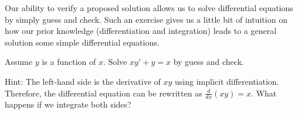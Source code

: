 \documentclass[../main.tex]{subfiles}
\begin{document}
Our ability to verify a proposed solution allows us to solve differential equations by simply guess and check. Such an exercise gives us a little bit of intuition on how our prior knowledge (differentiation and integration) leads to a general solution some simple differential equations.
\begin{example}
  Assume \(y\) is a function of \(x\). Solve \(xy' + y = x\) by guess and check.

  Hint: The left-hand side is the derivative of \(xy\) using implicit differentiation. Therefore, the differential equation can be rewritten as \(\frac{d}{dx} \left( xy \right) = x\). What happens if we integrate both sides?
\end{example}
\end{document}
